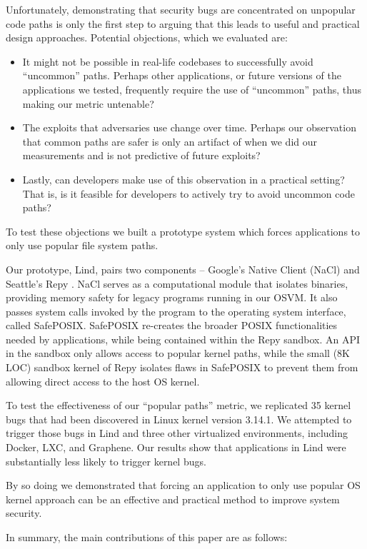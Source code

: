 Unfortunately, demonstrating that security bugs are concentrated on unpopular
code paths is only the first step to arguing that this leads to useful and
practical design approaches.  Potential objections, which we evaluated are:
\begin{itemize}
\item It might not be possible in real-life codebases to successfully avoid ``uncommon'' paths.  Perhaps other applications, or future versions of the applications we tested, frequently require the use of ``uncommon'' paths, thus making our metric untenable?
\item The exploits that adversaries use change over time.  Perhaps our observation that common paths are safer  is only an artifact of when we did our measurements and is not predictive of future exploits?
\item Lastly, can developers make use of this observation in a practical setting?  That is, is it feasible for developers to actively try to avoid uncommon code paths?
\end{itemize}
To test these objections we built a prototype system which forces applications
to only use popular file system paths.


Our prototype, Lind, pairs two components -- Google's Native Client
(NaCl) \cite{NaCl-09} and Seattle's Repy \cite{Repy-10}.
NaCl serves as a computational module that isolates
binaries, providing memory safety for legacy programs running in our OSVM.
It also passes system calls invoked by the program to the operating system interface, called SafePOSIX.
SafePOSIX re-creates the broader POSIX functionalities needed by applications, while being contained within the Repy sandbox. 
An API in the sandbox only allows access to popular kernel paths, while
the small (8K LOC) sandbox kernel of Repy isolates flaws in SafePOSIX
to prevent them from allowing direct access to the host OS kernel.

To test the effectiveness of our ``popular paths'' metric, 
we replicated 35 kernel bugs that had been
discovered in Linux kernel version 3.14.1.  We attempted to trigger those
bugs in Lind and three other virtualized environments,
including Docker, LXC, and Graphene.
Our results show that applications in Lind were substantially less likely to trigger
kernel bugs.

By so doing we demonstrated that forcing an application to only use popular
OS kernel approach can be an effective and practical method to improve
system security.

In summary, the main contributions of this paper are as follows:

